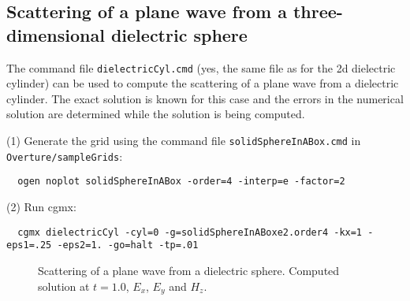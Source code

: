\clearpage
\subsection{Scattering of a plane wave from a three-dimensional dielectric sphere} \label{sec:sphere3dDielectricScat}

The command file {\tt dielectricCyl.cmd} (yes, the same file as for the 2d dielectric cylinder) can be used to compute the scattering
of a plane wave from a dielectric cylinder. The exact solution is known for this case
and the errors in the numerical solution are determined while the solution
is being computed.


\noindent (1) Generate the grid using the command file {\tt solidSphereInABox.cmd} in {\tt Overture/sampleGrids}:
{\small
\begin{verbatim}
  ogen noplot solidSphereInABox -order=4 -interp=e -factor=2
\end{verbatim}
}
\noindent (2) Run cgmx: 
{\small
\begin{verbatim}
  cgmx dielectricCyl -cyl=0 -g=solidSphereInABoxe2.order4 -kx=1 -eps1=.25 -eps2=1. -go=halt -tp=.01
\end{verbatim}
}
{
\begin{figure}[hbt]
\newcommand{\figWidth}{5.5cm}
\newcommand{\trimfig}[2]{\trimFig{#1}{#2}{0.1}{0.05}{.05}{.05}}
\begin{center}
\end{center}
\caption{Scattering of a plane wave from a dielectric sphere. Computed solution at $t=1.0$, $E_x$, $E_y$ and $H_z$.}
\label{fig:cyl2dDielectricScat}
\end{figure}
}

